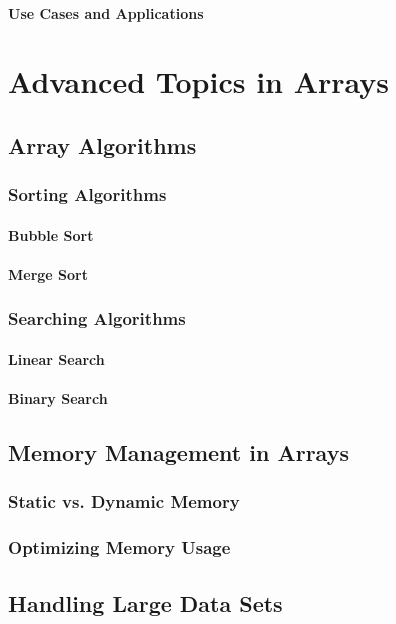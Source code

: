 \documentclass[12pt, oneside]{book}
\begin{document}
	\subsubsection{Use Cases and Applications}
	
	\chapter{Advanced Topics in Arrays}
	
	\section{Array Algorithms}
	\subsection{Sorting Algorithms}
	\subsubsection{Bubble Sort}
	\subsubsection{Merge Sort}
	\subsection{Searching Algorithms}
	\subsubsection{Linear Search}
	\subsubsection{Binary Search}
	
	\section{Memory Management in Arrays}
	\subsection{Static vs. Dynamic Memory}
	\subsection{Optimizing Memory Usage}
	
	\section{Handling Large Data Sets}
\end{document}
